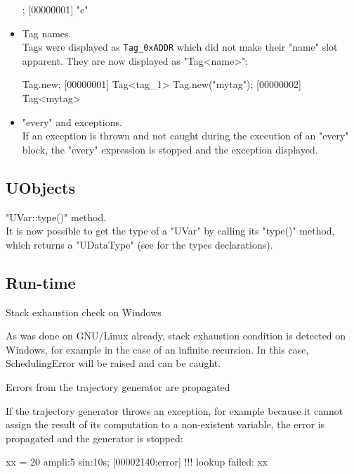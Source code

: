 \begin{itemize}
\begin{urbiscript}
["a", "b", "c"][-1];
[00000001] "c"
\end{urbiscript}

\item Tag names.\\
  Tags were displayed as \lstinline|Tag_0xADDR| which did not make
  their "name" slot apparent. They are now displayed as "Tag<name>":

\begin{urbiscript}
Tag.new;
[00000001] Tag<tag_1>
Tag.new("mytag");
[00000002] Tag<mytag>
\end{urbiscript}

\item "every" and exceptions.\\
  If an exception is thrown and not caught during the execution of an
  "every" block, the "every" expression is stopped and the exception
  displayed.
\end{itemize}

\subsection{UObjects}
\begin{description}
\item "UVar::type()" method.\\
  It is now possible to get the type of a "UVar" by calling its "type()"
  method, which returns a "UDataType" (see  for the
  types declarations).
\end{description}

\subsection{Run-time}
\begin{description}
\item Stack exhaustion check on Windows

  As was done on GNU/Linux already, stack exhaustion condition is detected
  on Windows, for example in the case of an infinite recursion. In this
  case, SchedulingError will be raised and can be caught.

\item Errors from the trajectory generator are propagated

  If the trajectory generator throws an exception, for example because it
  cannot assign the result of its computation to a non-existent variable,
  the error is propagated and the generator is stopped:

\begin{urbiunchecked}
xx = 20 ampli:5 sin:10s;
[00002140:error] !!! lookup failed: xx
\end{urbiunchecked}
\end{description}

